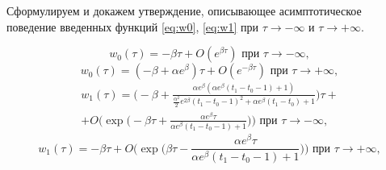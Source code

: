 Сформулируем и докажем утверждение, описывающее асимптотическое поведение введенных функций \eqref{eq:w0}, \eqref{eq:w1} при $\tau\to-\infty$ и $\tau\to+\infty$.
%
\begin{lemma}\label{lm:w_asymp}
\begin{equation}
    \label{eq:w0_asymp-}
    w_0(\tau)=-\beta \tau+O(e^{\beta\tau}) \text{ при } \tau\to -\infty,
\end{equation}
%
\begin{equation}
    \label{eq:w0_asymp+}
    w_0(\tau)=(-\beta+\alpha e^\beta) \tau+O(e^{-\beta\tau}) \text{ при } \tau\to +\infty,
\end{equation}
%
\begin{multline}
    \label{eq:w1_asymp-}
    w_1(\tau)=\Big(-\beta+\frac{\alpha e^\beta(\alpha e^\beta(t_1-t_0-1)+1)}{\frac{\alpha^2}{2}e^{2\beta}(t_1-t_0-1)^2+\alpha e^\beta(t_1-t_0)+1}\Big)\tau+
    \\
    +O\Big(\exp\Big(-\beta\tau+\frac{\alpha e^\beta\tau}{\alpha e^\beta(t_1-t_0-1)+1}\Big)\Big)\text{ при } \tau\to -\infty,
\end{multline}
%
\begin{equation}
    \label{eq:w1_asymp+}
    w_1(\tau)=-\beta\tau+O\Big(\exp\Big(\beta\tau-\frac{\alpha e^\beta\tau}{\alpha e^\beta(t_1-t_0-1)+1}\Big)\Big) \text{ при } \tau\to +\infty,
\end{equation}
\end{lemma}